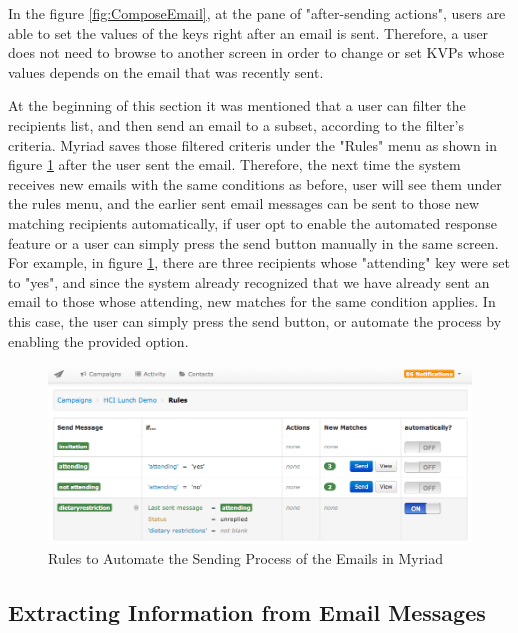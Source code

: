 In the figure \ref{fig:ComposeEmail}, at the pane of "after-sending actions", users are able to set the values of the keys right after an email is sent. Therefore, a user does not need to browse to another screen in order to change or set \ac{KVP}s whose values depends on the email that was recently sent.
\vspace{1cm}

At the beginning of this section it was mentioned that a user can filter the recipients list, and then send an email to a subset, according to the filter's criteria. Myriad saves those filtered criteris under the "Rules" menu as shown in figure \ref{fig:AutomatedRules} after the user sent the email. Therefore, the next time the system receives new emails with the same conditions as before, user will see them under the rules menu, and the earlier sent email messages can be sent to those new matching recipients automatically, if user opt to enable the automated response feature or a user can simply press the send button manually in the same screen. For example, in figure \ref{fig:AutomatedRules}, there are three recipients whose "attending" key were set to "yes", and since the system already recognized that we have already sent an email to those whose attending, new matches for the same condition applies. In this case, the user can simply press the send button, or automate the process by enabling the provided option.

\clearpage

\begin{figure}[htbp]
	\centering
	\includegraphics[width=1.00\textwidth]{imgs/AutomatedRules.png}
	\caption[Rules to Automate the Sending Process of the Emails in Myriad]{Rules to Automate the Sending Process of the Emails in Myriad}
	\label{fig:AutomatedRules}
\end{figure}

\subsection{Extracting Information from Email Messages}
\label{subsec:5.2.5:ExtrInfoEmaiMess}

